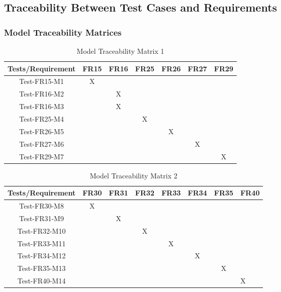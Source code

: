 \documentclass[12pt]{article}
\begin{document}
\subsection{Traceability Between Test Cases and Requirements}
\subsubsection{Model Traceability Matrices}
\begin{table}[htp]
\centering
\caption{Model Traceability Matrix 1}
\begin{tabular}{|c|c|c|c|c|c|c|}
\hline
Tests/Requirement & FR15 & FR16 & FR25 & FR26 & FR27 & FR29 \\
\hline
Test-FR15-M1      & X    &      &      &      &      &      \\
\hline
Test-FR16-M2      &      & X    &      &      &      &      \\
\hline
Test-FR16-M3      &      & X    &      &      &      &      \\
\hline
Test-FR25-M4      &      &      & X    &      &      &      \\
\hline
Test-FR26-M5      &      &      &      & X    &      &      \\
\hline
Test-FR27-M6      &      &      &      &      & X    &      \\
\hline
Test-FR29-M7      &      &      &      &      &      & X\\
\hline   
\end{tabular}
\end{table}
\begin{table}[htp]
\centering
\caption{Model Traceability Matrix 2}
\begin{tabular}{|c|c|c|c|c|c|c|l|}
\hline
Tests/Requirement & FR30 & FR31 & FR32 & FR33 & FR34 & FR35 & FR40 \\
\hline
Test-FR30-M8      & X    &      &      &      &      &        &      \\
\hline
Test-FR31-M9      &      & X    &      &      &      &        &      \\
\hline
Test-FR32-M10     &      &      & X    &      &      &        &      \\
\hline
Test-FR33-M11     &      &      &      & X    &      &        &      \\
\hline
Test-FR34-M12     &      &      &      &      & X    &        &      \\
\hline
Test-FR35-M13   &      &      &      &      &      & X      &      \\
\hline
Test-FR40-M14     &      &      &      &      &      &        & X   \\
\hline
\end{tabular}
\end{table}
\newpage
\end{document}
